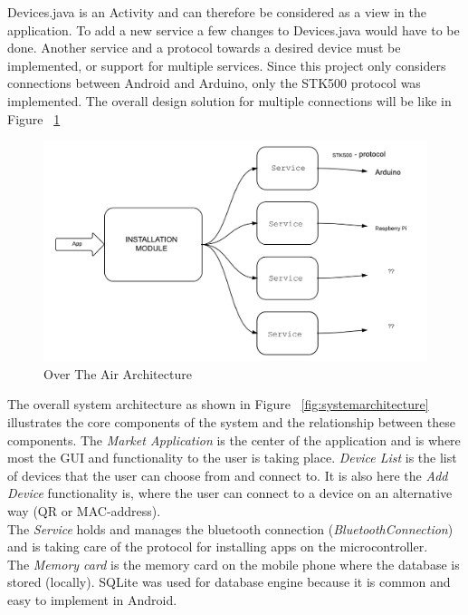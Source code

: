 	Devices.java is an Activity and can therefore be considered as a view in the application. To add a new service a few changes to Devices.java would have to be done. Another service and a protocol towards a desired device must be implemented, or support for multiple services. Since this project only considers connections between Android and Arduino, only the STK500 protocol was implemented.
	The overall design solution for multiple connections will be like in Figure ~\ref{fig:otaarchitecture}\\
	\begin{figure}[H]
	\includegraphics[scale=0.7]{figures/OTAArchitecture.pdf}
	\caption{Over The Air Architecture}
	\label{fig:otaarchitecture}
	\end{figure}

	The overall system architecture as shown in Figure ~\ref{fig:systemarchitecture} illustrates the core components of the system and the relationship between these components. The \textit{Market Application} is the center of the application and is where most the GUI and functionality to the user is taking place. \textit{Device List} is the list of devices that the user can choose from and connect to. It is also here the \textit{Add Device} functionality is, where the user can connect to a device on an alternative way (QR or MAC-address).\\

	The \textit{Service} holds and manages the bluetooth connection (\textit{BluetoothConnection}) and is taking care of the protocol for installing apps on the microcontroller. \\

	The \textit{Memory card} is the memory card on the mobile phone where the database is stored (locally). SQLite was used for database engine because it is common and easy to implement in Android.\\

